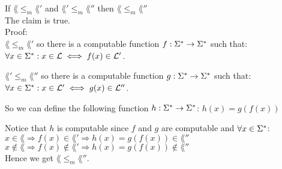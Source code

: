 If $\lang \leq_m \lang'$ and $\lang' \leq_m \lang''$ then $\lang \leq_m \lang''$ \\

The claim is true. \\

Proof: \\
$\lang \leq_m \lang'$  so there is a computable function  $f: \Sigma^* \rightarrow \Sigma^*$ such that: \\
$\forall x \in \Sigma^*: x \in \mathcal{L}  \iff f(x) \in \mathcal{L}'$.

$\lang'\leq_m \lang''$ so there is a computable function $g: \Sigma^* \rightarrow \Sigma^*$ such that: \\
$\forall x \in \Sigma^*: x \in \mathcal{L}' \iff g(x) \in \mathcal{L}''$.

So we can define the following function $h: \Sigma^* \rightarrow \Sigma^*$:
$h(x) = g(f(x))$

Notice that $h$ is computable since $f$ and $g$ are computable and $\forall x \in \Sigma^*$: \\
$x \in    \lang \Rightarrow f(x) \in    \lang' \Rightarrow h(x) = g(f(x)) \in    \lang''$ \\
$x \notin \lang \Rightarrow f(x) \notin \lang' \Rightarrow h(x) = g(f(x)) \notin \lang''$ \\

Hence we get $\lang \leq_m \lang''$. \\